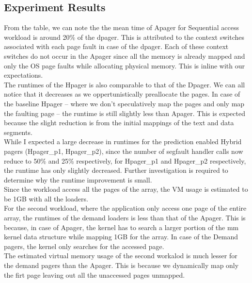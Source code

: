 \documentclass{article}
\begin{document}
\subsection{Experiment Results}

    From the table, we can note the the mean time of Apager for Sequential access workload is around 20\% of the dpager. 
    This is attributed to the context switches associated with each page fault in case of the dpager. Each 
    of these context switches do not occur in the Apager since all the memory is already mapped and only 
    the OS page faults while allocating physical memory. This is inline with our expectations.\\ 
    
    The runtimes of the Hpager is also comparable to that of the Dpager. We can all notice that it 
    decreases as we oppertunistically preallocate the pages. In case of the baseline Hpager -- where we 
    don't speculatively map the pages and only map the faulting page -- the runtime is still slightly 
    less than Apager. This is expected because the slight reduction is from the initial mappings of 
    the text and data segments.\\

    While I expected a large decrease in runtimes for the prediction enabled Hybrid pagers (Hpager\_p1, Hpager\_p2),
    since the number
    of segfault handler calls now reduce to 50\% and 25\% respectively, for Hpager\_p1 and Hpager\_p2
    respectively, the runtime has only slightly decreased. Further investigation is required to determine
    why the runtime improvement is small.\\

    Since the workload access all the pages of the array, the VM usage is estimated to be 1GB with all the 
    loaders.\\

    For the second workload, where the application only access one page of the entire array, the runtimes 
    of the demand loaders is less than that of the Apager. This is because, in case of Apager, the kernel 
    has to search a larger portion of the mm kernel data structure while mapping 1GB for the array. In 
    case of the Demand pagers, the kernel only searches for the accessed page.\\

    The estimated virtual memory usage of the second workalod is much lesser for the demand pagers than the
    Apager. This is because we dynamically map only the firt page leaving out all the unaccessed pages unmapped. \\
\end{document}
